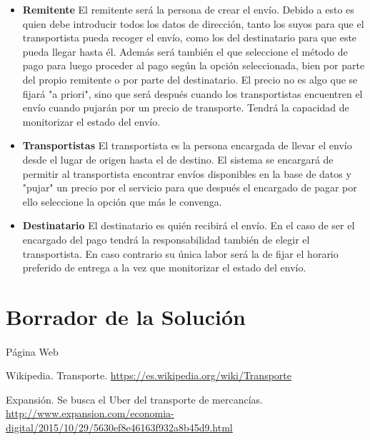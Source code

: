 \documentclass[10pt, a4paper,spanish]{article}
\begin{document}
			\begin{itemize}

				\item{\textbf{Remitente}}
				\newline
				El remitente será la persona de crear el envío. Debido a esto es quien debe introducir todos los datos de dirección, tanto los suyos para que el transportista pueda recoger el envío, como los del destinatario para que este pueda llegar hasta él. Además será también el que seleccione el método de pago para luego proceder al pago según la opción seleccionada, bien por parte del propio remitente o por parte del destinatario. El precio no es algo que se fijará "a priori", sino que será después cuando los transportistas encuentren el envío cuando pujarán por un precio de transporte. Tendrá la capacidad de monitorizar el estado del envío.

				\item{\textbf{Transportistas}}
				\newline
				El transportista es la persona encargada de llevar el envío desde el lugar de origen hasta el de destino. El sistema se encargará de permitir al transportista encontrar envíos disponibles en la base de datos y "pujar" un precio por el servicio para que después el encargado de pagar por ello seleccione la opción que más le convenga.

				\item{\textbf{Destinatario}}
				\newline
				El destinatario es quién recibirá el envío. En el caso de ser el encargado del pago tendrá la responsabilidad también de elegir el transportista. En caso contrario su única labor será la de fijar el horario preferido de entrega a la vez que monitorizar el estado del envío.

			\end{itemize}
		\section{Borrador de la Solución}

			\paragraph{}
			Página Web

	\begin{thebibliography}{9}

		Wikipedia. Transporte. \url{https://es.wikipedia.org/wiki/Transporte}

		Expansión. Se busca el Uber del transporte de mercancías. \url{http://www.expansion.com/economia-digital/2015/10/29/5630ef8e46163f932a8b45d9.html}

	\end{thebibliography}
\end{document}
